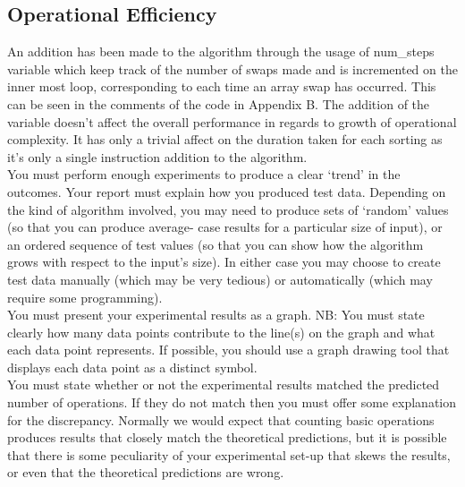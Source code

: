 \documentclass[]{article}
\begin{document}
\subsection{Operational Efficiency}
An addition has been made to the algorithm through the usage of num\_steps variable which keep track of the number of swaps made and is incremented on the inner most loop, corresponding to each time an array swap has occurred. This can be seen in the comments of the code in Appendix B. The addition of the variable doesn't affect the overall performance in regards to growth of operational complexity. It has only a trivial affect on the duration taken for each sorting as it's only a single instruction addition to the algorithm.
\\
You must perform enough experiments to produce a clear ‘trend’ in the outcomes. Your
report must explain how you produced test data. Depending on the kind of algorithm
involved, you may need to produce sets of ‘random’ values (so that you can produce average-
case results for a particular size of input), or an ordered sequence of test values (so that you
can show how the algorithm grows with respect to the input’s size). In either case you may
choose to create test data manually (which may be very tedious) or automatically (which may
require some programming).
\\
You must present your experimental results as a graph. NB: You must state clearly how many
data points contribute to the line(s) on the graph and what each data point represents. If
possible, you should use a graph drawing tool that displays each data point as a distinct
symbol.
\\
You must state whether or not the experimental results matched the predicted number of
operations. If they do not match then you must offer some explanation for the discrepancy.
Normally we would expect that counting basic operations produces results that closely match
the theoretical predictions, but it is possible that there is some peculiarity of your experimental
set-up that skews the results, or even that the theoretical predictions are wrong.
\end{document}
